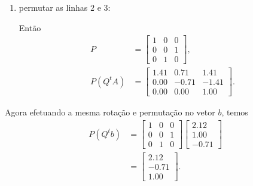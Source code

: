 \begin{questions}
\begin{solution}
\begin{enumerate}
            \item permutar as linhas $2$ e $3$:

                Ent\~{a}o
                \begin{align*}
                    P &= \begin{bmatrix}
                        1 & 0 & 0 \\
                        0 & 0 & 1 \\
                        0 & 1 & 0
                    \end{bmatrix}, \\
                    P \left( Q^t A \right) &= \begin{bmatrix}
                        1.41 & 0.71 & 1.41 \\
                        0.00 & -0.71 & -1.41 \\
                        0.00 & 0.00 & 1.00
                    \end{bmatrix}.
                \end{align*}
        \end{enumerate}

        Agora efetuando a mesma rota\c{c}\~{a}o e permuta\c{c}\~{a}o no vetor $b$, temos
        \begin{align*}
            P \left( Q^t b \right) &= \begin{bmatrix}
                1 & 0 & 0 \\
                0 & 0 & 1 \\
                0 & 1 & 0
            \end{bmatrix} \begin{bmatrix}
                2.12 \\
                1.00 \\
                -0.71
            \end{bmatrix} \\
            &= \begin{bmatrix}
                2.12 \\
                -0.71 \\
                1.00
            \end{bmatrix}.
        \end{align*}


\end{solution}
\end{questions}
